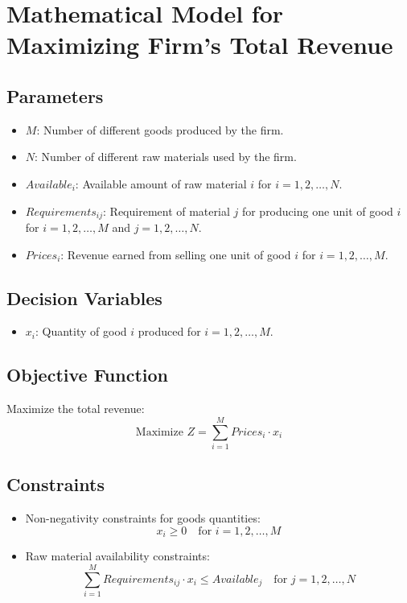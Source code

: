 \documentclass{article}
\begin{document}
\section*{Mathematical Model for Maximizing Firm's Total Revenue}

\subsection*{Parameters}
\begin{itemize}
    \item $M$: Number of different goods produced by the firm.
    \item $N$: Number of different raw materials used by the firm.
    \item $Available_i$: Available amount of raw material $i$ for $i = 1, 2, \ldots, N$.
    \item $Requirements_{ij}$: Requirement of material $j$ for producing one unit of good $i$ for $i = 1, 2, \ldots, M$ and $j = 1, 2, \ldots, N$.
    \item $Prices_i$: Revenue earned from selling one unit of good $i$ for $i = 1, 2, \ldots, M$.
\end{itemize}

\subsection*{Decision Variables}
\begin{itemize}
    \item $x_i$: Quantity of good $i$ produced for $i = 1, 2, \ldots, M$.
\end{itemize}

\subsection*{Objective Function}
Maximize the total revenue:
\[
\text{Maximize } Z = \sum_{i=1}^{M} Prices_i \cdot x_i
\]

\subsection*{Constraints}
\begin{itemize}
    \item Non-negativity constraints for goods quantities:
    \[
    x_i \geq 0 \quad \text{for } i = 1, 2, \ldots, M
    \]
    \item Raw material availability constraints:
    \[
    \sum_{i=1}^{M} Requirements_{ij} \cdot x_i \leq Available_j \quad \text{for } j = 1, 2, \ldots, N
    \]
\end{itemize}
\end{document}
